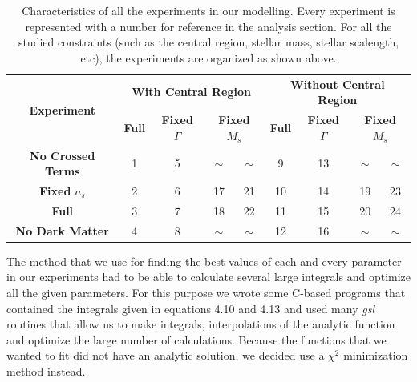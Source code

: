 \begin{table}[H]
\centering
\label{my-label}
\begin{tabular}{|c|c|c|c|c|c|c|c|c|}
\hline
\multicolumn{1}{|c|}{\multirow{3}{*}{\textbf{Experiment}}} & \multicolumn{4}{c|}{\multirow{2}{*}{\textbf{With Central Region}}}                      & \multicolumn{4}{c|}{\multirow{2}{*}{\textbf{Without Central Region}}}                     \\
\multicolumn{1}{|l|}{}                  & \multicolumn{4}{c|}{}                                                                   & \multicolumn{4}{c|}{}                                                                    \\ \cline{2-9} 
\multicolumn{1}{|l|}{}                  & \textbf{Full}    & \textbf{Fixed $\Gamma$}    & \multicolumn{2}{c|}{\textbf{Fixed $M_s$}} & \textbf{Full}     & \textbf{Fixed $\Gamma$}     & \multicolumn{2}{c|}{\textbf{Fixed $M_s$}} \\ \hline
\textbf{No Crossed Terms}               & 1                & 5                       & $\sim$               & $\sim$              & 9                 & 13                       & $\sim$               & $\sim$              \\ \hline
\textbf{Fixed $a_s$}                       & 2                & 6                       & 17                   & 21                  & 10                & 14                       & 19                   & 23                  \\ \hline
\textbf{Full}                           & 3                & 7                       & 18                   & 22                  & 11                & 15                       & 20                   & 24                  \\ \hline
\textbf{No Dark Matter}                 & 4                & 8                       & $\sim$               & $\sim$              & 12                & 16                       & $\sim$               & $\sim$              \\ \hline
\end{tabular}
\caption[Characteristics of all the experiments]{Characteristics of all the experiments in our modelling. Every experiment is represented with a number for reference in the analysis section. For all the studied constraints (such as the central region, stellar mass, stellar scalength, etc), the experiments are organized as shown above.}
\end{table}

The method that we use for finding the best values of each and every parameter in our experiments had to be able to calculate several large integrals and optimize all the given parameters. For this purpose we wrote some C-based programs that contained the integrals given in equations 4.10 and 4.13 and used many \textit{gsl} routines that allow us to make integrals, interpolations of the analytic function and optimize the large number of calculations. Because the functions that we wanted to fit did not have an analytic solution, we decided use a $\chi^{2}$ minimization method instead. 

